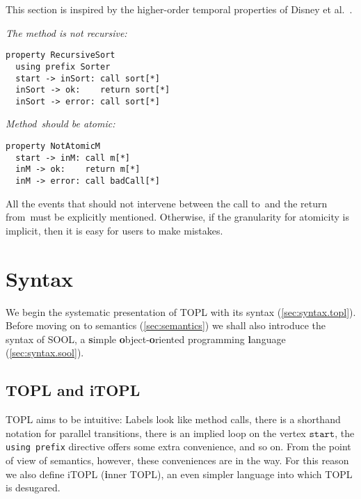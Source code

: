 \documentclass[preprint]{sigplanconf} %
\newcommand{\delimitVerbatim}{\par\nobreak\smallskip\noindent}
\newcommand{\start}{\ensuremath{\mathtt{start}}\xspace}
\theoremstyle{definition}
\theoremstyle{remark}
\begin{document}
This section is inspired by the higher-order temporal properties of Disney et al.~\cite{disney2011}.

\medskip\emph{The \Verb@sort@ method is not recursive:}
\delimitVerbatim
\begin{Verbatim}[commandchars=\\\{\}]
property RecursiveSort
  using prefix Sorter
  start -> inSort: call sort[*]
  inSort -> ok:    return sort[*]
  inSort -> error: call sort[*]
\end{Verbatim}

\medskip\emph{Method~\Verb@m@ should be atomic:}
\delimitVerbatim
\begin{Verbatim}[commandchars=\\\{\}]
property NotAtomicM
  start -> inM: call m[*]
  inM -> ok:    return m[*]
  inM -> error: call badCall[*]
\end{Verbatim}
\delimitVerbatim
All the events that should not intervene between the call to~\Verb@m@ and the return from~\Verb@m@ must be explicitly mentioned.
Otherwise, if the granularity for atomicity is implicit, then it is easy for users to make mistakes.

\section{Syntax}\label{sec:syntax} %

We begin the systematic presentation of TOPL with its syntax (\autoref{sec:syntax.topl}).
Before moving on to semantics (\autoref{sec:semantics}) we shall also introduce the syntax of SOOL, a \textbf simple \textbf object-\textbf oriented programming \textbf language (\autoref{sec:syntax.sool}).

\subsection{TOPL and iTOPL}\label{sec:syntax.topl} %


TOPL aims to be intuitive:
Labels look like method calls, there is a shorthand notation for parallel transitions, there is an implied loop on the vertex \start, the \texttt{using prefix} directive offers some extra convenience, and so on.
From the point of view of semantics, however, these conveniences are in the way.
For this reason we also define iTOPL (\textbf inner TOPL), an even simpler language into which TOPL is desugared.
\end{document}
